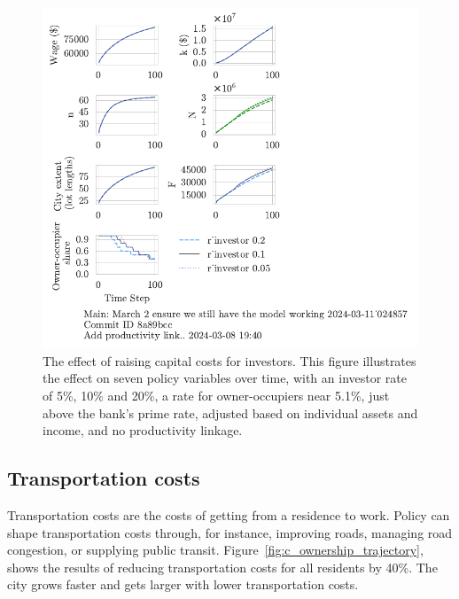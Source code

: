 \begin{figure}[h!t]
\raggedleft
\hspace{5cm}
\includegraphics[scale=0.9, trim={0 1.4cm 0 0},clip]{fig/r_investor-Main-024857.pdf}
\caption[The effect of raising capital costs for investors]{The effect of raising capital costs for investors. This figure illustrates the effect on seven policy variables over time, with an investor rate of 5\%, 10\% and 20\%, a rate for owner-occupiers near 5.1\%, just above the bank's prime rate, adjusted based on individual assets and income, and no productivity linkage.}
\label{fig:capital_ownership_trajectory}
\end{figure}

\newpage

\subsection{Transportation costs} 
Transportation costs are the costs of getting from a residence to work. Policy can shape transportation costs through, for instance, improving roads, managing road congestion, or supplying public transit. %
Figure~\ref{fig:c_ownership_trajectory}, shows the results of reducing transportation costs for all residents by 40\%. 
The city grows faster and gets larger with lower transportation costs.%

